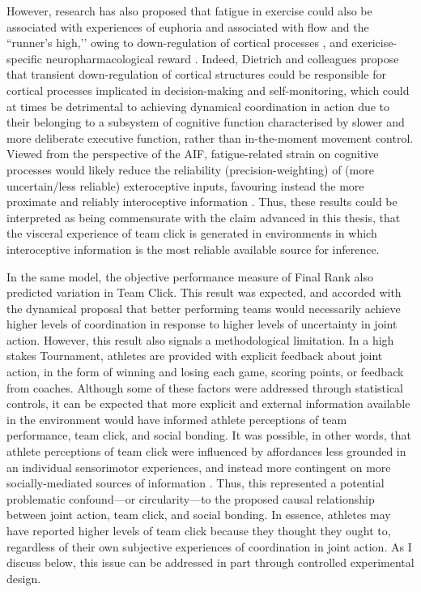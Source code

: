\begin{CJK}{UTF8}{gbsn}
However, research has also proposed that fatigue in exercise could also be associated with experiences of euphoria and associated with flow and the ``runner’s high,’’ owing to down-regulation of cortical processes \citep{Dietrich2011}, and exericise-specific neuropharmacological reward \citep{Raichlen2008}.  Indeed, Dietrich and colleagues propose that transient down-regulation of cortical structures could be responsible for cortical processes implicated in decision-making and self-monitoring, which could at times be detrimental to achieving dynamical coordination in action due to their belonging to a subsystem of cognitive function \citep[i.e., a deliberate ``system 2’’ as opposed to more automatic and implicit ``system 1''; see ][]{Kahneman2011} characterised by slower and more deliberate executive function, rather than in-the-moment movement control.  Viewed from the perspective of the AIF, fatigue-related strain on cognitive processes would likely reduce the reliability (precision-weighting) of (more uncertain/less reliable) exteroceptive inputs, favouring instead the more proximate and reliably interoceptive information \citep{Pezullo2014,Barret2017}.  Thus, these results could be interpreted as being commensurate with the claim advanced in this thesis, that the visceral experience of team click is generated in environments in which interoceptive information is the most reliable available source for inference.

In the same model, the objective performance measure of Final Rank also predicted variation in Team Click.  This result was expected, and accorded with the dynamical proposal that better performing teams would necessarily achieve higher levels of coordination in response to higher levels of uncertainty in joint action.  However, this result also signals a methodological limitation.  In a high stakes Tournament, athletes are provided with explicit feedback about joint action, in the form of winning and losing each game, scoring points, or feedback from coaches.   Although some of these factors were addressed through statistical controls, it can be expected that more explicit and external information available in the environment would have informed athlete perceptions of team performance, team click, and social bonding.  It was possible, in other words, that athlete perceptions of team click were influenced by affordances less grounded in an individual sensorimotor experiences, and instead more contingent on more socially-mediated sources of information \citep{Ramstead2016}.  Thus, this represented a potential problematic confound—or circularity---to the proposed causal relationship between joint action, team click, and social bonding. In essence, athletes may have reported higher levels of team click because they thought they ought to, regardless of their own subjective experiences of coordination in joint action. As I discuss below, this issue can be addressed in part through controlled experimental design.



\end{CJK}
